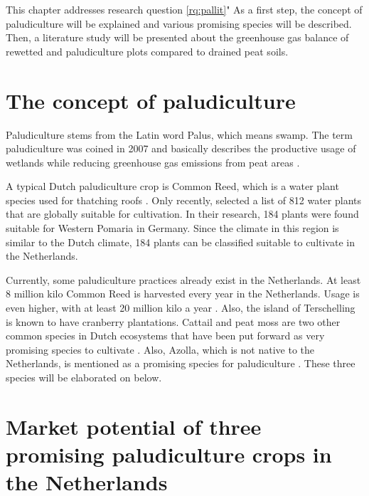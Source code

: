 {This chapter addresses research question \ref{rq:pallit}" As a first step, the concept of paludiculture will be explained and various promising species will be described. Then, a literature study will be presented about the greenhouse gas balance of rewetted and paludiculture plots compared to drained peat soils.

\section{The concept of paludiculture}

Paludiculture stems from the Latin word Palus, which means swamp. The term paludiculture was coined in 2007 and basically describes the productive usage of wetlands while reducing greenhouse gas emissions from peat areas \citep{wichtmann2007paludiculture}. 

A typical Dutch paludiculture crop is Common Reed, which is a water plant species used for thatching roofs \citep{wichtmann2016paludiculture}. Only recently, \citet{abel2013database} selected a list of 812 water plants that are globally suitable for cultivation. In their research, 184 plants were found suitable for Western Pomaria in Germany. Since the climate in this region is similar to the Dutch climate, 184 plants can be classified suitable to cultivate in the Netherlands. 

Currently, some paludiculture practices already exist in the Netherlands. At least 8 million kilo Common Reed is harvested every year in the Netherlands. Usage is even higher, with at least 20 million kilo a year \citep{wichtmann2016paludiculture}. Also, the island of Terschelling is known to have cranberry plantations. Cattail and peat moss are two other common species in Dutch ecosystems that have been put forward as very promising species to cultivate \citep{abel2013database, van2013werk}. Also, Azolla, which is not native to the Netherlands, is mentioned as a promising species for paludiculture \citep{abel2013database, van2013werk}. 
These three species will be elaborated on below.

\section{Market potential of three promising paludiculture crops in the Netherlands}

}
